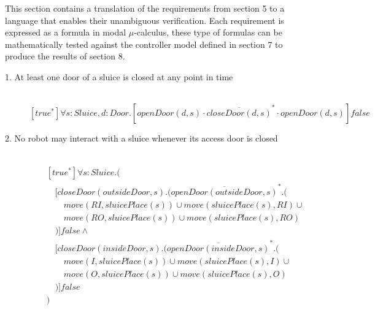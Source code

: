 
\newcommand{\tab}{\hspace{1em}}
\cbstart
This section contains a translation of the requirements from section 5 to a language that enables their unambiguous verification. Each requirement is expressed as a formula in modal $\mu$-calculus, these type of formulas can be mathematically tested against the controller model defined in section 7 to produce the results of section 8. \cbend

\begin{description}
 \item[1. At least one door of a sluice is closed at any point in time]\mbox{}\\
\[
[true^*]\forall s:Sluice,d:Door.[openDoor(d, s) \cdot \overline{closeDoor(d, s)}^* \cdot openDoor(d, s)]\mathit{false}
\]


 \item[2. No robot may interact with a sluice whenever its access door is closed]\mbox{}\\
\begin{align*}
& [true^*]\forall s:Sluice.( \\
& \tab [closeDoor(outsideDoor, s).(\overline{openDoor(outsideDoor, s)}^*.( \\
& \tab\tab move(RI, sluicePlace(s)) \cup move(sluicePlace(s), RI) \cup \\
& \tab\tab move(RO, sluicePlace(s)) \cup move(sluicePlace(s), RO) \\
& \tab )]false \wedge \\
& \tab [closeDoor(insideDoor, s).(\overline{openDoor(insideDoor, s)}^*.( \\
& \tab\tab move(I, sluicePlace(s)) \cup move(sluicePlace(s), I) \cup \\
& \tab\tab move(O, sluicePlace(s)) \cup move(sluicePlace(s), O) \\
& \tab )]\mathit{false} \\
& )
\end{align*}
 
\cbstart
 \item[]
 

\end{description}
